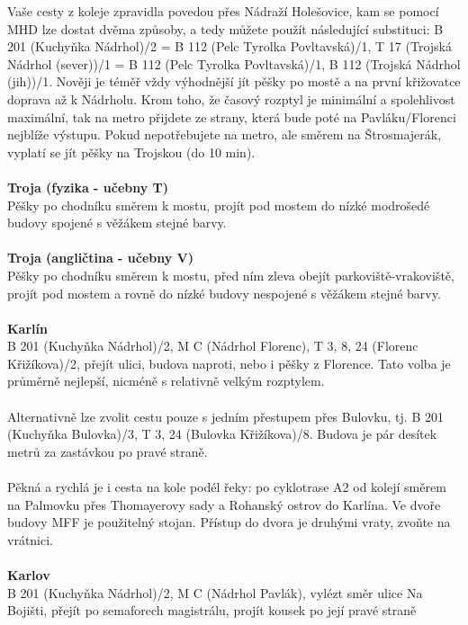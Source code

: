 Vaše cesty z koleje zpravidla povedou přes Nádraží Holešovice, kam se pomocí MHD
lze dostat dvěma způsoby, a tedy můžete použít následující substituci: B 201
(Kuchyňka \ra Nádrhol)/2 = B 112 (Pelc Tyrolka \ra Povltavská)/1, T 17 (Trojská
\ra Nádrhol (sever))/1 = B 112 (Pelc Tyrolka \ra Povltavská)/1, B 112 (Trojská
\ra Nádrhol (jih))/1. Nověji je téměř vždy výhodnější jít pěšky po mostě a na
první křižovatce doprava až k Nádrholu. Krom toho, že časový rozptyl je
minimální a spolehlivost maximální, tak na metro přijdete ze strany, která bude
poté na Pavláku/Florenci nejblíže výstupu. Pokud nepotřebujete na metro, ale
směrem na Štrosmajerák, vyplatí se jít pěšky na Trojskou (do 10 min).
\\\\
\textbf{Troja (fyzika - učebny T)}\\
Pěšky po chodníku směrem k mostu, projít pod mostem do nízké modrošedé budovy
spojené s věžákem stejné barvy.
\\\\
\textbf{Troja (angličtina - učebny V)}\\
Pěšky po chodníku směrem k mostu, před ním zleva obejít parkoviště-vrakoviště,
projít pod mostem a rovně do nízké budovy nespojené s věžákem stejné barvy.
\\\\
\textbf{Karlín}\\
B 201 (Kuchyňka \ra Nádrhol)/2, M C (Nádrhol \ra Florenc), T 3, 8, 24 (Florenc
\ra Křižíkova)/2, přejít ulici, budova naproti, nebo i pěšky z Florence. Tato
volba je průměrně nejlepší, nicméně s relativně velkým rozptylem.
\\\\
Alternativně lze zvolit cestu pouze s jedním přestupem přes Bulovku, tj. B 201
(Kuchyňka \ra Bulovka)/3, T 3, 24 (Bulovka \ra Křižíkova)/8. Budova je pár
desítek metrů za zastávkou po pravé straně.
\\\\
Pěkná a rychlá je i cesta na kole podél řeky: po cyklotrase A2 od kolejí směrem
na Palmovku přes Thomayerovy sady a Rohanský ostrov do Karlína. Ve dvoře budovy
MFF je použitelný stojan. Přístup do dvora je druhými vraty, zvoňte na vrátnici.
\\\\
\textbf{Karlov} \\
B 201 (Kuchyňka \ra Nádrhol)/2, M C (Nádrhol \ra Pavlák), vylézt směr ulice Na
Bojišti, přejít po semaforech magistrálu, projít kousek po její pravé straně
